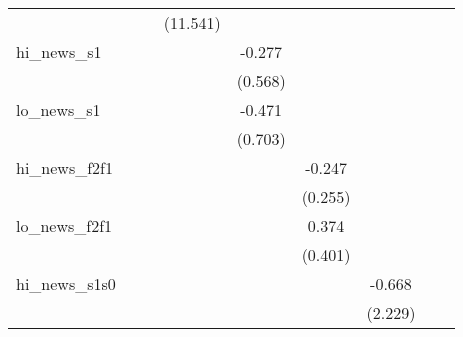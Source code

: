 {\begin{tabular}{l*{8}{c}}
            &                     &                     &    (11.541)         &                     &                     &                     &                     &                     \\
\addlinespace
hi\_news\_s1  &                     &                     &                     &      -0.277         &                     &                     &                     &                     \\
            &                     &                     &                     &     (0.568)         &                     &                     &                     &                     \\
\addlinespace
lo\_news\_s1  &                     &                     &                     &      -0.471         &                     &                     &                     &                     \\
            &                     &                     &                     &     (0.703)         &                     &                     &                     &                     \\
\addlinespace
hi\_news\_f2f1&                     &                     &                     &                     &      -0.247         &                     &                     &                     \\
            &                     &                     &                     &                     &     (0.255)         &                     &                     &                     \\
\addlinespace
lo\_news\_f2f1&                     &                     &                     &                     &       0.374         &                     &                     &                     \\
            &                     &                     &                     &                     &     (0.401)         &                     &                     &                     \\
\addlinespace
hi\_news\_s1s0&                     &                     &                     &                     &                     &      -0.668         &                     &                     \\
            &                     &                     &                     &                     &                     &     (2.229)         &                     &                     \\

\end{tabular}}
